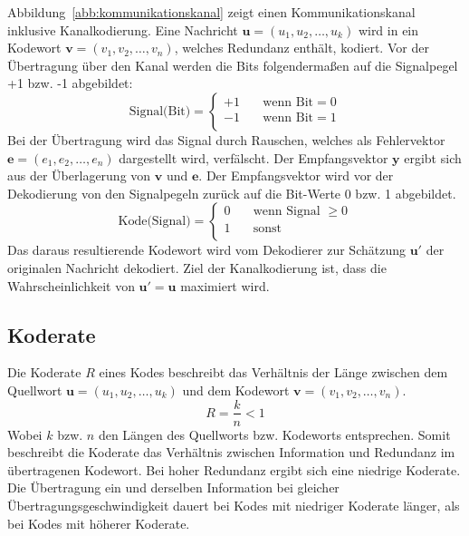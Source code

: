 Abbildung~\ref{abb:kommunikationskanal} zeigt einen Kommunikationskanal inklusive Kanalkodierung. Eine Nachricht $\mathbf{u}=\left( u_{1},u_{2},\dots ,u_{k}\right)$ wird in ein Kodewort $\mathbf{v}=\left( v_{1},v_{2},\dots ,v_{n}\right)$, welches Redundanz enthält, kodiert. Vor der Übertragung über den Kanal werden die Bits folgendermaßen auf die Signalpegel +1 bzw. -1 abgebildet:
\begin{equation}
\text{Signal(Bit)} =
\begin{cases}
  +1  & \quad \text{wenn Bit} = 0\\
  -1  & \quad \text{wenn Bit} = 1\\
\end{cases}
\label{eq:bit_zu_signal_abbildung}
\end{equation}
Bei der Übertragung wird das Signal durch Rauschen, welches als Fehlervektor $\mathbf{e}=\left( e_{1},e_{2},\dots ,e_{n}\right)$ dargestellt wird, verfälscht. Der Empfangsvektor $\mathbf{y}$ ergibt sich aus der Überlagerung von $\mathbf{v}$ und $\mathbf{e}$. Der Empfangsvektor wird vor der Dekodierung von den Signalpegeln zurück auf die Bit-Werte 0 bzw. 1 abgebildet.
\begin{equation}
\text{Kode(Signal)} =
\begin{cases}
  0  & \quad \text{wenn Signal } \geq 0\\
  1  & \quad \text{sonst}\\
\end{cases}
\label{eq:signal_zu_bit_abbildung}
\end{equation}
Das daraus resultierende Kodewort wird vom Dekodierer zur Schätzung $\mathbf{u'}$ der originalen Nachricht dekodiert. Ziel der Kanalkodierung ist, dass die Wahrscheinlichkeit von $\mathbf{u'}=\mathbf{u}$ maximiert wird.

\subsection{Koderate}
\label{kapitel:grundlagen_koderate}
Die Koderate $R$ eines Kodes beschreibt das Verhältnis der Länge zwischen dem Quellwort $\mathbf{u}=\left( u_{1},u_{2},\dots ,u_{k}\right)$ und dem Kodewort $\mathbf{v}=\left( v_{1},v_{2},\dots ,v_{n}\right)$.
\begin{equation}
R=\frac{k}{n}<1
\end{equation}
Wobei $k$ bzw. $n$ den Längen des Quellworts bzw. Kodeworts entsprechen. Somit beschreibt die Koderate das Verhältnis zwischen Information und Redundanz im übertragenen Kodewort. Bei hoher Redundanz ergibt sich eine niedrige Koderate. Die Übertragung ein und derselben Information bei gleicher Übertragungsgeschwindigkeit dauert bei Kodes mit niedriger Koderate länger, als bei Kodes mit höherer Koderate.

